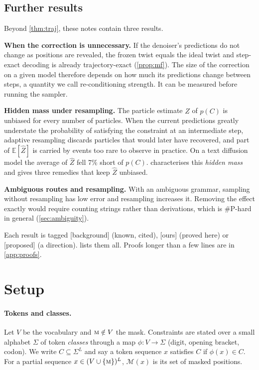 \documentclass[11pt]{article}
\theoremstyle{definition}
\newcommand{\M}{\mathcal{M}}
\newcommand{\mask}{\textsc{m}}
\newcommand{\E}{\mathbb{E}}
\newcommand{\Zh}{\widehat Z}
\newcommand{\status}[1]{\textsf{\small[#1]}}
\begin{document}
\subsection{Further results}
Beyond \cref{thm:traj}, these notes contain three results.

\textbf{When the correction is unnecessary.} If the denoiser's predictions do not change as positions are
revealed, the frozen twist equals the ideal twist and step-exact decoding is already trajectory-exact
(\cref{prop:mf}). The size of the correction on a given model therefore depends on how much its predictions change
between steps, a quantity we call re-conditioning strength. It can be measured before running the sampler.

\textbf{Hidden mass under resampling.} The particle estimate $\Zh$ of $p(C)$ is unbiased for every number of
particles. When the current predictions greatly understate the probability of satisfying the constraint at an
intermediate step, adaptive resampling discards particles that would later have recovered, and part of $\E[\Zh]$
is carried by events too rare to observe in practice. On a text diffusion model the average of $\Zh$ fell 7\%
short of $p(C)$.  characterises this \emph{hidden mass} and gives three remedies that keep
$\Zh$ unbiased.

\textbf{Ambiguous routes and resampling.} With an ambiguous grammar, sampling without resampling has low error and
resampling increases it. Removing the effect exactly would require counting strings rather than derivations,
which is \#P-hard in general (\cref{sec:ambiguity}).

Each result is tagged \status{background} (known, cited), \status{ours} (proved here) or \status{proposed} (a
direction).  lists them all. Proofs longer than a few lines are in \cref{app:proofs}.

\section{Setup}\label{sec:setup}

\paragraph{Tokens and classes.}
Let $V$ be the vocabulary and $\mask\notin V$ the mask. Constraints are stated over a small alphabet $\Sigma$ of
token \emph{classes} through a map $\phi:V\to\Sigma$ (digit, opening bracket, codon). We write $C\subseteq\Sigma^L$
and say a token sequence $x$ satisfies $C$ if $\phi(x)\in C$. For a partial sequence $x\in(V\cup\{\mask\})^L$,
$\M(x)$ is its set of masked positions.
\end{document}
